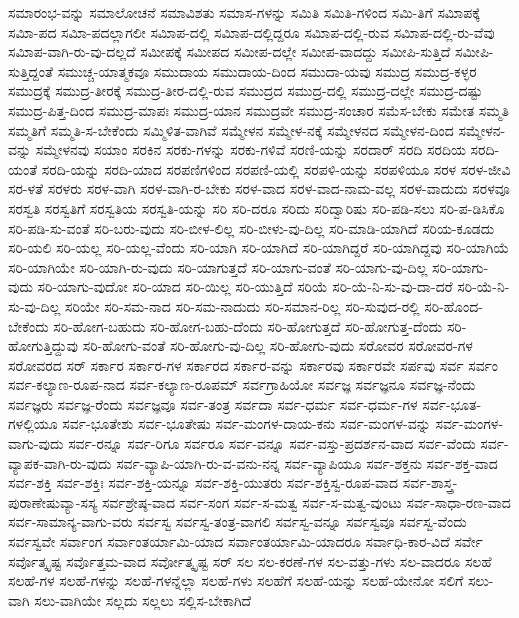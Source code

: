 {ಸಮಾರಂಭ-ವನ್ನು
ಸಮಾಲೋಚನೆ
ಸಮಾವಿಶತು
ಸಮಾಸ-ಗಳನ್ನು
ಸಮಿತಿ
ಸಮಿತಿ-ಗಳಿಂದ
ಸಮಿ-ತಿಗೆ
ಸಮಿಾಪಕ್ಕೆ
ಸಮಿಾ-ಪದ
ಸಮಿಾ-ಪದಲ್ಲಾಗಲೀ
ಸಮಿಾಪ-ದಲ್ಲಿ
ಸಮಿಾಪ-ದಲ್ಲಿದ್ದರೂ
ಸಮಿಾಪ-ದಲ್ಲಿ-ರುವ
ಸಮಿಾಪ-ದಲ್ಲಿ-ರು-ವೆವು
ಸಮಿಾಪ-ವಾಗಿ-ರು-ವು-ದಲ್ಲದೆ
ಸಮೀಪಕ್ಕೆ
ಸಮೀಪದ
ಸಮೀಪ-ದಲ್ಲೇ
ಸಮೀಪ-ವಾದದ್ದು
ಸಮೀಪಿ-ಸುತ್ತಿದೆ
ಸಮೀಪಿ-ಸುತ್ತಿದ್ದಂತೆ
ಸಮುಚ್ಚ-ಯಾತ್ಮಕವೂ
ಸಮುದಾಯ
ಸಮುದಾಯ-ದಿಂದ
ಸಮುದಾ-ಯವು
ಸಮುದ್ರ
ಸಮುದ್ರ-ಕಳ್ಳರ
ಸಮುದ್ರಕ್ಕೆ
ಸಮುದ್ರ-ತೀರಕ್ಕೆ
ಸಮುದ್ರ-ತೀರ-ದಲ್ಲಿ-ರುವ
ಸಮುದ್ರದ
ಸಮುದ್ರ-ದಲ್ಲಿ
ಸಮುದ್ರ-ದಲ್ಲೇ
ಸಮುದ್ರ-ದಷ್ಟು
ಸಮುದ್ರ-ಪಿತ್ತ-ದಿಂದ
ಸಮುದ್ರ-ಮಾಪಃ
ಸಮುದ್ರ-ಯಾನ
ಸಮುದ್ರವೇ
ಸಮುದ್ರ-ಸಂಚಾರ
ಸಮೆಸ-ಬೇಕು
ಸಮೇತ
ಸಮ್ಮತಿ
ಸಮ್ಮತಿಗೆ
ಸಮ್ಮತಿ-ಸ-ಬೇಕೆಂದು
ಸಮ್ಮಿಳಿತ-ವಾಗಿವೆ
ಸಮ್ಮೇಳನ
ಸಮ್ಮೇಳ-ನಕ್ಕೆ
ಸಮ್ಮೇಳನದ
ಸಮ್ಮೇಳನ-ದಿಂದ
ಸಮ್ಮೇಳನ-ವನ್ನು
ಸಮ್ಮೇಳನವು
ಸಯಾಂ
ಸರಕಿನ
ಸರಕು-ಗಳನ್ನು
ಸರಕು-ಗಳಿವೆ
ಸರಣಿ-ಯನ್ನು
ಸರದಾರ್
ಸರದಿ
ಸರದಿಯ
ಸರದಿ-ಯಂತೆ
ಸರದಿ-ಯನ್ನು
ಸರದಿ-ಯಾದ
ಸರಪಣಿಗಳಿಂದ
ಸರಪಣಿ-ಯಲ್ಲಿ
ಸರಪಳಿ-ಯನ್ನು
ಸರಪಳಿಯೂ
ಸರಳ
ಸರಳ-ಜೀವಿ
ಸರ-ಳತೆ
ಸರಳರು
ಸರಳ-ವಾಗಿ
ಸರಳ-ವಾಗಿ-ರ-ಬೇಕು
ಸರಳ-ವಾದ
ಸರಳ-ವಾದ-ನಾಮ-ವಲ್ಲ
ಸರಳ-ವಾದುದು
ಸರಳವೂ
ಸರಸ್ವತಿ
ಸರಸ್ವತಿಗೆ
ಸರಸ್ವತಿಯ
ಸರಸ್ವತಿ-ಯನ್ನು
ಸರಿ
ಸರಿ-ದರೂ
ಸರಿದು
ಸರಿದ್ವಾರಿಷು
ಸರಿ-ಪಡಿ-ಸಲು
ಸರಿ-ಪ-ಡಿಸಿಕೊ
ಸರಿ-ಪಡಿ-ಸು-ವಂತೆ
ಸರಿ-ಬರು-ವುದು
ಸರಿ-ಬೀಳ-ಲಿಲ್ಲ
ಸರಿ-ಬೀಳು-ವು-ದಿಲ್ಲ
ಸರಿ-ಮಾಡಿ-ಯಾಗಿದೆ
ಸರಿಯ-ಕೂಡದು
ಸರಿ-ಯಲಿ
ಸರಿ-ಯಲ್ಲ
ಸರಿ-ಯಲ್ಲ-ವೆಂದು
ಸರಿ-ಯಾಗಿ
ಸರಿ-ಯಾಗಿದೆ
ಸರಿ-ಯಾಗಿದ್ದರೆ
ಸರಿ-ಯಾಗಿದ್ದವು
ಸರಿ-ಯಾಗಿಯೆ
ಸರಿ-ಯಾಗಿಯೇ
ಸರಿ-ಯಾಗಿ-ರು-ವುದು
ಸರಿ-ಯಾಗುತ್ತದೆ
ಸರಿ-ಯಾಗು-ವಂತೆ
ಸರಿ-ಯಾಗು-ವು-ದಿಲ್ಲ
ಸರಿ-ಯಾಗು-ವುದು
ಸರಿ-ಯಾಗು-ವುದೋ
ಸರಿ-ಯಾದ
ಸರಿ-ಯಿಲ್ಲ
ಸರಿ-ಯುತ್ತಿದೆ
ಸರಿಯೆ
ಸರಿ-ಯೆ-ನಿ-ಸು-ವು-ದಾ-ದರೆ
ಸರಿ-ಯೆ-ನಿ-ಸು-ವು-ದಿಲ್ಲ
ಸರಿಯೇ
ಸರಿ-ಸಮ-ನಾದ
ಸರಿ-ಸಮ-ನಾದುದು
ಸರಿ-ಸಮಾನ-ರಿಲ್ಲ
ಸರಿ-ಸುವುದ-ರಲ್ಲಿ
ಸರಿ-ಹೊಂದ-ಬೇಕೆಂದು
ಸರಿ-ಹೋಗ-ಬಹುದು
ಸರಿ-ಹೋಗ-ಬಹು-ದೆಂದು
ಸರಿ-ಹೋಗುತ್ತದೆ
ಸರಿ-ಹೋಗುತ್ತ-ದೆಂದು
ಸರಿ-ಹೋಗುತ್ತಿದ್ದುವು
ಸರಿ-ಹೋಗು-ವಂತೆ
ಸರಿ-ಹೋಗು-ವು-ದಿಲ್ಲ
ಸರಿ-ಹೋಗು-ವುದು
ಸರೋವರ
ಸರೋವರ-ಗಳ
ಸರೋವರದ
ಸರ್
ಸರ್ಕಾರ
ಸರ್ಕಾರ-ಗಳ
ಸರ್ಕಾರದ
ಸರ್ಕಾರ-ವನ್ನು
ಸರ್ಕಾರವು
ಸರ್ಕಾರವೇ
ಸರ್ಪವು
ಸರ್ವ
ಸರ್ವಂ
ಸರ್ವ-ಕಲ್ಯಾಣ-ರೂಪ-ನಾದ
ಸರ್ವ-ಕಲ್ಯಾಣ-ರೂಪಮ್
ಸರ್ವಗ್ರಾಹಿಯೋ
ಸರ್ವಜ್ಞ
ಸರ್ವಜ್ಞನೂ
ಸರ್ವಜ್ಞ-ನೆಂದು
ಸರ್ವಜ್ಞರು
ಸರ್ವಜ್ಞ-ರೆಂದು
ಸರ್ವಜ್ಞವೂ
ಸರ್ವ-ತಂತ್ರ
ಸರ್ವದಾ
ಸರ್ವ-ಧರ್ಮ
ಸರ್ವ-ಧರ್ಮ-ಗಳ
ಸರ್ವ-ಭೂತ-ಗಳಲ್ಲಿಯೂ
ಸರ್ವ-ಭೂತೇಶು
ಸರ್ವ-ಭೂತೇಷು
ಸರ್ವ-ಮಂಗಳ-ದಾಯ-ಕನು
ಸರ್ವ-ಮಂಗಳ-ವನ್ನು
ಸರ್ವ-ಮಂಗಳ-ವಾಗು-ವುದು
ಸರ್ವ-ರನ್ನೂ
ಸರ್ವ-ರಿಗೂ
ಸರ್ವರೂ
ಸರ್ವ-ವನ್ನೂ
ಸರ್ವ-ವಸ್ತು-ಪ್ರದರ್ಶನ-ವಾದ
ಸರ್ವ-ವೆಂದು
ಸರ್ವ-ವ್ಯಾಪಕ-ವಾಗಿ-ರು-ವುದು
ಸರ್ವ-ವ್ಯಾಪಿ-ಯಾಗಿ-ರು-ವ-ವನು-ನನ್ನ
ಸರ್ವ-ವ್ಯಾಪಿಯೂ
ಸರ್ವ-ಶಕ್ತನು
ಸರ್ವ-ಶಕ್ತ-ವಾದ
ಸರ್ವ-ಶಕ್ತಿ
ಸರ್ವ-ಶಕ್ತಿಃ
ಸರ್ವ-ಶಕ್ತಿ-ಯನ್ನೂ
ಸರ್ವ-ಶಕ್ತಿ-ಯುತರು
ಸರ್ವ-ಶಕ್ತಿಸ್ವ-ರೂಪ-ವಾದ
ಸರ್ವ-ಶಾಸ್ತ್ರ-ಪುರಾಣೇಷುವ್ಯಾ-ಸಸ್ಯ
ಸರ್ವಶ್ರೇಷ್ಠ-ವಾದ
ಸರ್ವ-ಸಂಗ
ಸರ್ವ-ಸ-ಮತ್ವ
ಸರ್ವ-ಸ-ಮತ್ವ-ವುಂಟು
ಸರ್ವ-ಸಾಧಾ-ರಣ-ವಾದ
ಸರ್ವ-ಸಾಮಾನ್ಯ-ವಾಗು-ವರು
ಸರ್ವಸ್ವ
ಸರ್ವಸ್ವ-ತಂತ್ರ-ವಾಗಲಿ
ಸರ್ವಸ್ವ-ವನ್ನೂ
ಸರ್ವಸ್ವವೂ
ಸರ್ವಸ್ವ-ವೆಂದು
ಸರ್ವಸ್ವವೇ
ಸರ್ವಾಂಗ
ಸರ್ವಾಂತರ್ಯಾಮಿ-ಯಾದ
ಸರ್ವಾಂತರ್ಯಾಮಿ-ಯಾದರೂ
ಸರ್ವಾಧಿ-ಕಾರ-ವಿದೆ
ಸರ್ವೇ
ಸರ್ವೊತ್ಕೃಷ್ಟ
ಸರ್ವೊತ್ತಮ-ವಾದ
ಸರ್ವೋತ್ಕೃಷ್ಟ
ಸರ್
ಸಲ
ಸಲ-ಕರಣೆ-ಗಳ
ಸಲ-ವತ್ತು-ಗಳು
ಸಲ-ವಾದರೂ
ಸಲಹೆ
ಸಲಹೆ-ಗಳ
ಸಲಹೆ-ಗಳನ್ನು
ಸಲಹೆ-ಗಳನ್ನೆಲ್ಲಾ
ಸಲಹೆ-ಗಳು
ಸಲಹೆಗೆ
ಸಲಹೆ-ಯನ್ನು
ಸಲಹೆ-ಯೇನೋ
ಸಲಿಗೆ
ಸಲು-ವಾಗಿ
ಸಲು-ವಾಗಿಯೇ
ಸಲ್ಲದು
ಸಲ್ಲಲು
ಸಲ್ಲಿಸ-ಬೇಕಾಗಿದೆ
}
